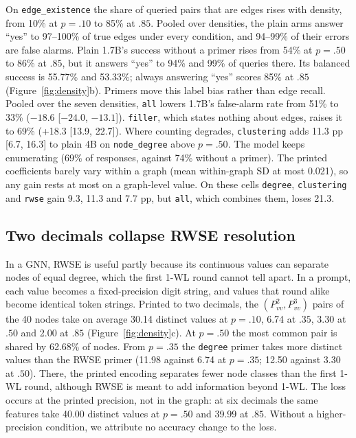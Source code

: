 \documentclass[11pt]{article}
\newcommand{\task}[1]{\texttt{#1}}
\newcommand{\cond}[1]{\texttt{#1}}
\begin{document}
On \task{edge\_existence} the share of queried pairs that are edges rises
with density, from 10\% at $p{=}.10$ to 85\% at $.85$. Pooled over densities,
the plain arms answer ``yes'' to 97--100\% of true edges under every
condition, and 94--99\% of their errors are false alarms. Plain 1.7B's
success without a primer rises from 54\% at $p{=}.50$ to 86\% at $.85$, but
it answers ``yes'' to 94\% and 99\% of queries there. Its balanced success
is 55.77\% and 53.33\%; always answering ``yes'' scores 85\% at $.85$
(Figure~\ref{fig:density}b). Primers move this label bias rather than
edge recall. Pooled over the seven densities, \cond{all} lowers 1.7B's
false-alarm rate from 51\% to 33\% ($-18.6$ [$-24.0$, $-13.1$]).
\cond{filler}, which states nothing about edges, raises it to 69\% (+18.3
[13.9, 22.7]). Where counting degrades, \cond{clustering} adds 11.3 pp [6.7, 16.3] to
plain 4B on \task{node\_degree} above $p{=}.50$. The model keeps enumerating
(69\% of responses, against 74\% without a primer). The printed coefficients
barely vary within a graph (mean within-graph SD at most
0.021), so any gain rests at most on a graph-level value. On these cells
\cond{degree}, \cond{clustering} and \cond{rwse} gain 9.3, 11.3 and 7.7 pp,
but \cond{all}, which combines them, loses 21.3.

\subsection{Two decimals collapse RWSE resolution}
\label{sec:resolution}

In a GNN, RWSE is useful partly because its continuous values can separate
nodes of equal degree, which the first 1-WL round cannot tell apart. In a
prompt, each value becomes a fixed-precision digit string, and values that
round alike become identical token strings. Printed to two decimals, the
$(P^2_{vv}, P^3_{vv})$ pairs
of the 40 nodes take on average 30.14 distinct values at $p{=}.10$, 6.74 at
$.35$, 3.30 at $.50$ and 2.00 at $.85$ (Figure~\ref{fig:density}c). At
$p{=}.50$ the most common pair is shared by 62.68\% of nodes. From
$p{=}.35$ the \cond{degree} primer takes more distinct values than
the RWSE primer (11.98 against 6.74 at $p{=}.35$; 12.50 against 3.30 at
$.50$). There, the printed encoding separates fewer node classes than the
first 1-WL round, although RWSE is meant to add information beyond 1-WL.
The loss occurs at the printed precision, not in the graph: at six decimals the same
features take 40.00 distinct values at $p{=}.50$ and 39.99 at $.85$. Without a higher-precision condition, we
attribute no accuracy change to the loss.
\end{document}
